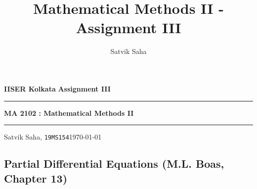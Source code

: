 \documentclass[10pt]{article}
\title{Mathematical Methods II - Assignment III}
\author{Satvik Saha}
\date{}
\begin{document}
        \par\textbf{IISER Kolkata} \hfill \textbf{Assignment III}
        \vspace{3pt}
        \hrule
        \vspace{3pt}
        \begin{center}
                \LARGE{\textbf{MA 2102 : Mathematical Methods II}}
        \end{center}
        \vspace{3pt}
        \hrule
        \vspace{3pt}
        Satvik Saha, \texttt{19MS154}\hfill\today
        \vspace{20pt}
        \subsection*{Partial Differential Equations (M.L. Boas, Chapter 13)}
\end{document}
